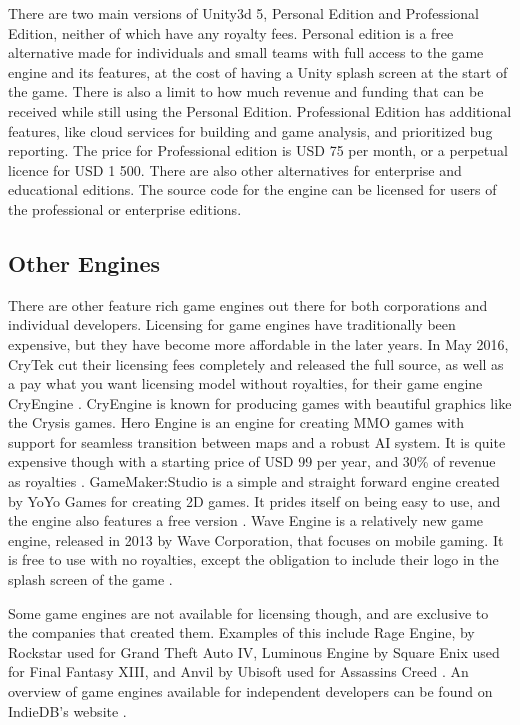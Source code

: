There are two main versions of Unity3d 5, Personal Edition and Professional Edition, neither of which have any royalty fees. Personal edition is a free alternative made for individuals and small teams with full access to the game engine and its features, at the cost of having a Unity splash screen at the start of the game. There is also a limit to how much revenue and funding that can be received while still using the Personal Edition. Professional Edition has additional features, like cloud services for building and game analysis, and prioritized bug reporting. The price for Professional edition is USD 75 per month, or a perpetual licence for USD 1 500. There are also other alternatives for enterprise and educational editions. The source code for the engine can be licensed for users of the professional or enterprise editions. \cite{unity2016get}

\subsection{Other Engines}
There are other feature rich game engines out there for both corporations and individual developers. Licensing for game engines have traditionally been expensive, but they have become more affordable in the later years. In May 2016, CryTek cut their licensing fees completely and released the full source, as well as a pay what you want licensing model without royalties, for their game engine CryEngine \cite{papadopoulos2016cry}. CryEngine is known for producing games with beautiful graphics like the Crysis games. 
Hero Engine is an engine for creating MMO games with support for seamless transition between maps and a robust AI system. It is quite expensive though with a starting price of USD 99 per year, and 30\% of revenue as royalties \cite{fabrik2016licence}.
GameMaker:Studio is a simple and straight forward engine created by YoYo Games for creating 2D games. It prides itself on being easy to use, and the engine also features a free version \cite{yoyo2016gamemaker}.
Wave Engine is a relatively new game engine, released in 2013 by Wave Corporation, that focuses on mobile gaming. It is free to use with no royalties, except the obligation to include their logo in the splash screen of the game \cite{wave2016engine}. 

Some game engines are not available for licensing though, and are exclusive to the companies that created them. Examples of this include Rage Engine, by Rockstar used for Grand Theft Auto IV, Luminous Engine by Square Enix used for Final Fantasy XIII, and Anvil by Ubisoft used for Assassins Creed \cite{1up2008gta, makuzawa2015final, bayer2009assassins}. An overview of game engines available for independent developers can be found on IndieDB's website \cite{indiedb2015engine}.

